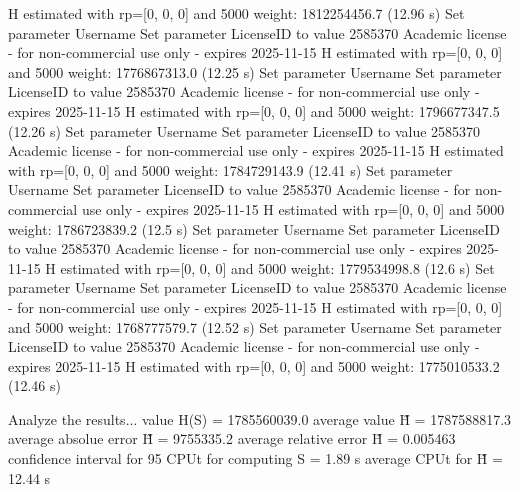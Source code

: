   H estimated with rp=[0, 0, 0] and 5000 weight:  1812254456.7  (12.96 s)
Set parameter Username
Set parameter LicenseID to value 2585370
Academic license - for non-commercial use only - expires 2025-11-15
  H estimated with rp=[0, 0, 0] and 5000 weight:  1776867313.0  (12.25 s)
Set parameter Username
Set parameter LicenseID to value 2585370
Academic license - for non-commercial use only - expires 2025-11-15
  H estimated with rp=[0, 0, 0] and 5000 weight:  1796677347.5  (12.26 s)
Set parameter Username
Set parameter LicenseID to value 2585370
Academic license - for non-commercial use only - expires 2025-11-15
  H estimated with rp=[0, 0, 0] and 5000 weight:  1784729143.9  (12.41 s)
Set parameter Username
Set parameter LicenseID to value 2585370
Academic license - for non-commercial use only - expires 2025-11-15
  H estimated with rp=[0, 0, 0] and 5000 weight:  1786723839.2  (12.5 s)
Set parameter Username
Set parameter LicenseID to value 2585370
Academic license - for non-commercial use only - expires 2025-11-15
  H estimated with rp=[0, 0, 0] and 5000 weight:  1779534998.8  (12.6 s)
Set parameter Username
Set parameter LicenseID to value 2585370
Academic license - for non-commercial use only - expires 2025-11-15
  H estimated with rp=[0, 0, 0] and 5000 weight:  1768777579.7  (12.52 s)
Set parameter Username
Set parameter LicenseID to value 2585370
Academic license - for non-commercial use only - expires 2025-11-15
  H estimated with rp=[0, 0, 0] and 5000 weight:  1775010533.2  (12.46 s)

Analyze the results...
  value H(S)                  = 1785560039.0 
  average value H̃             = 1787588817.3 
  average absolue error H̃     = 9755335.2 
  average relative error H̃    = 0.005463 
  confidence interval for 95%
  CPUt for computing S         = 1.89 s
  average CPUt for H̃           = 12.44 s


